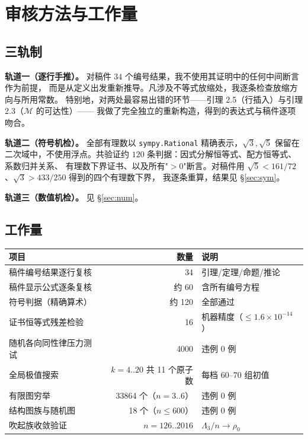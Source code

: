 \documentclass[UTF8,11pt]{ctexart}
\theoremstyle{definition}
\newcommand{\Lam}{\Lambda}
\begin{document}
\section{审核方法与工作量}\label{sec:method}

\subsection{三轨制}
\textbf{轨道一（逐行手推）。} 对稿件 $34$ 个编号结果，我不使用其证明中的任何中间断言作为前提，
而是从定义出发重新推导。凡涉及不等式放缩处，我逐条检查放缩方向与所用常数。
特别地，对两处最容易出错的环节——引理 2.5（行插入）与引理 2.3（$\mathcal M$ 的可达性）——
我做了完全独立的重新构造，得到的表达式与稿件逐项吻合。

\textbf{轨道二（符号机检）。} 全部有理数以 \texttt{sympy.Rational} 精确表示，$\sqrt3,\sqrt5$
保留在二次域中，不使用浮点。共验证约 $120$ 条判据：因式分解恒等式、配方恒等式、系数归并关系、
有理数下界证书、以及所有"$>0$"断言。对稿件用 $\sqrt5<161/72$、$\sqrt3>433/250$ 得到的四个有理数下界，
我逐条重算，结果见 \S\ref{sec:sym}。

\textbf{轨道三（数值机检）。} 见 \S\ref{sec:num}。

\subsection{工作量}
\begin{center}
\small
\begin{tabular}{lrl}
\toprule
项目 & 数量 & 说明\\
\midrule
稿件编号结果逐行复核 & 34 & 引理/定理/命题/推论\\
稿件显示公式逐条复核 & 约 60 & 含所有编号方程\\
符号判据（精确算术） & 约 120 & 全部通过\\
证书恒等式残差检验 & 16 & 机器精度（$\le1.6\times10^{-14}$）\\
随机各向同性律压力测试 & 4000 & 违例 $0$ 例\\
全局极值搜索 & $k=4..20$ 共 11 个原子数 & 每档 $60$--$70$ 组初值\\
有限图穷举 & 33864 个（$n=3..6$） & 违例 $0$ 例\\
结构图族与随机图 & 18 个（$n\le600$） & 违例 $0$ 例\\
吹起族收敛验证 & $n=126..2016$ & $\Lam_3/n\to\rho_0$\\
\bottomrule
\end{tabular}
\end{center}
\end{document}
